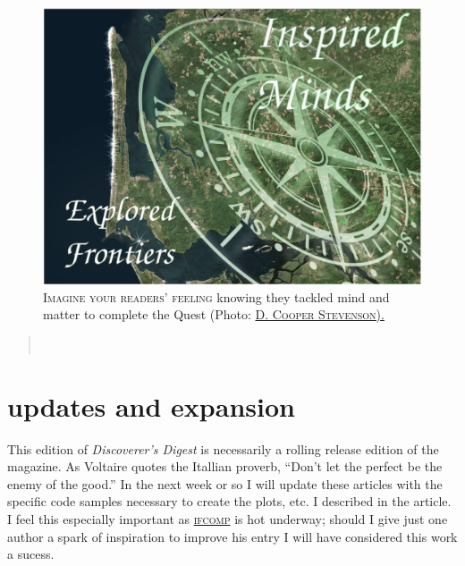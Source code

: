 \begin{figure}[h]                                                           
 \includegraphics[width=\linewidth]{./media/images/engaged}%
  \small{\textsc{\\ Imagine your readers' feeling} knowing they tackled mind and matter to complete the Quest (Photo:
    \href{http:portfolio.cooper.stevenson.name}{\textsc{D. Cooper Stevenson).}}}
  \label{fig:engaged}%
\end{figure}                                                                
\begin{quotation} 
\noindent{}\\[2mm]
   \hfill{}
\end{quotation} 

\section{updates and expansion}
This edition of \textit{Discoverer's Digest} is necessarily a rolling release
edition of the magazine. As Voltaire quotes the Itallian proverb, ``Don’t let
the perfect be the enemy of the good.'' In the next week or so I will update
these articles with the specific code samples necessary to create the plots,
etc. I described in the article. I feel this especially important as
\href{http://ifcomp.org}{\textsc{ifcomp}} is hot underway; should I give just
one author a spark of inspiration to improve his entry I will have considered
this work a sucess.

